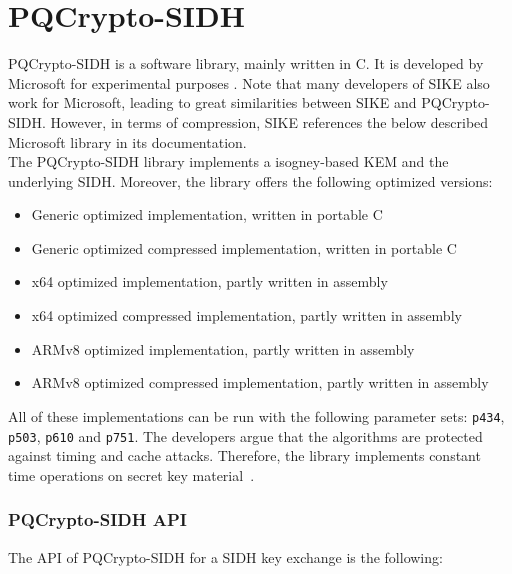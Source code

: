 \section{PQCrypto-SIDH}
PQCrypto-SIDH is a software library, mainly written in C. It is developed by Microsoft for experimental purposes \parencite{microsoft2020sidh}. Note that many developers of SIKE also work for Microsoft, leading to great similarities between SIKE and PQCrypto-SIDH. However, in terms of compression, SIKE references the below described Microsoft library in its documentation.\\
The PQCrypto-SIDH library implements a isogney-based KEM and the underlying SIDH. Moreover, the library offers the following optimized versions:
\begin{itemize}
  \item Generic optimized implementation, written in portable C
  \item Generic optimized compressed implementation, written in portable C
  \item x64 optimized implementation, partly written in assembly
  \item x64 optimized compressed implementation, partly written in assembly
  \item ARMv8 optimized implementation, partly written in assembly
  \item ARMv8 optimized compressed implementation, partly written in assembly
\end{itemize}
All of these implementations can be run with the following parameter sets: \texttt{p434}, \texttt{p503}, \texttt{p610} and \texttt{p751}. The developers argue that the algorithms are protected against timing and cache attacks. Therefore, the library implements constant time operations on secret key material~\parencite{microsoft2020sidh}.
\subsubsection{PQCrypto-SIDH API}
The API of PQCrypto-SIDH for a SIDH key exchange is the following:

